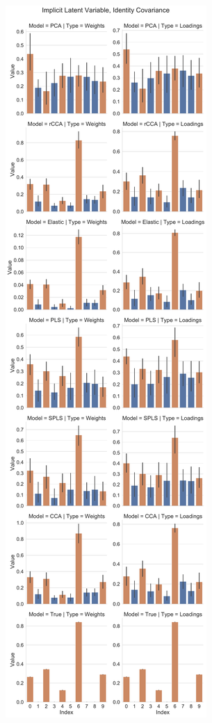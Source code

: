 \begin{figure}
    \centering
    \begin{subfigure}{0.49\linewidth}
        \centering
        \includegraphics[width=\linewidth]{figures/simulated/low/Combined_Weights_Loadings_with_Error_Bars_Identity_Covariance_implicit}

\end{subfigure}
\end{figure}

